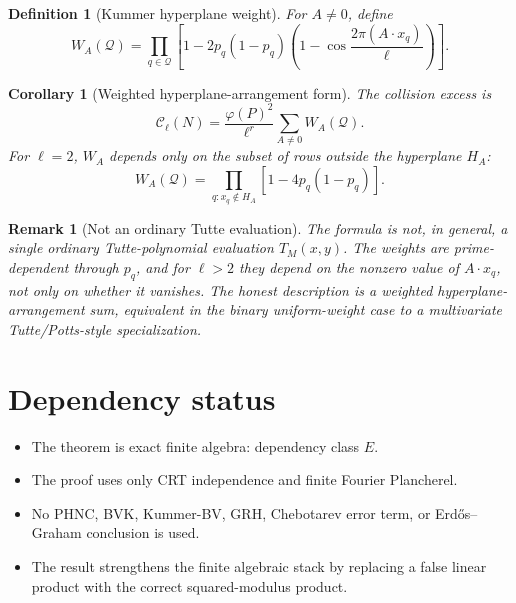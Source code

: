 \documentclass[11pt]{article}
\newtheorem{corollary}{Corollary}
\newtheorem{definition}{Definition}
\newtheorem{remark}{Remark}
\begin{document}
\begin{definition}[Kummer hyperplane weight]
For \(A\ne0\), define
\[
W_A(\mathcal Q)=
\prod_{q\in\mathcal Q}
\left[
1-2p_q(1-p_q)
\left(1-\cos\frac{2\pi(A\cdot x_q)}{\ell}\right)
\right].
\]
\end{definition}

\begin{corollary}[Weighted hyperplane-arrangement form]
The collision excess is
\[
\mathcal C_\ell(N)
=
\frac{\varphi(P)^2}{\ell^r}
\sum_{A\ne0}W_A(\mathcal Q).
\]
For \(\ell=2\), \(W_A\) depends only on the subset of rows outside the hyperplane \(H_A\):
\[
W_A(\mathcal Q)=
\prod_{q:x_q\notin H_A}
\left[1-4p_q(1-p_q)\right].
\]
\end{corollary}

\begin{remark}[Not an ordinary Tutte evaluation]
The formula is not, in general, a single ordinary Tutte-polynomial evaluation \(T_M(x,y)\).  The weights are prime-dependent through \(p_q\), and for \(\ell>2\) they depend on the nonzero value of \(A\cdot x_q\), not only on whether it vanishes.  The honest description is a weighted hyperplane-arrangement sum, equivalent in the binary uniform-weight case to a multivariate Tutte/Potts-style specialization.
\end{remark}

\section{Dependency status}

\begin{itemize}[leftmargin=2em]
\item The theorem is exact finite algebra: dependency class \(E\).
\item The proof uses only CRT independence and finite Fourier Plancherel.
\item No PHNC, BVK, Kummer-BV, GRH, Chebotarev error term, or Erd\H{o}s--Graham conclusion is used.
\item The result strengthens the finite algebraic stack by replacing a false linear product with the correct squared-modulus product.
\end{itemize}
\end{document}
